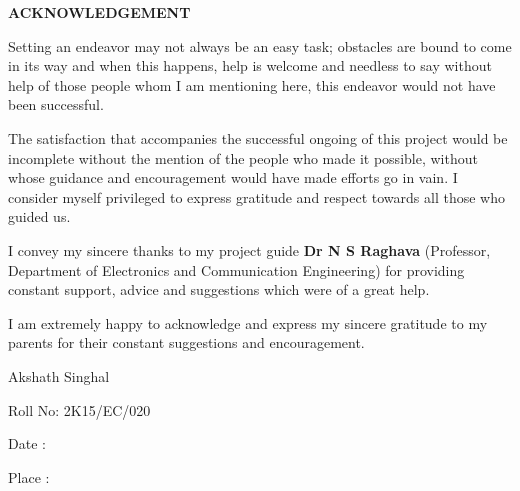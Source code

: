 \begin{spacing}{2}
\begin{center}
\fontsize{24pt}{24pt}\selectfont \textbf{ACKNOWLEDGEMENT\\}
\vspace*{1cm}
\end{center}
\fontsize{14pt}{14pt}\selectfont

Setting an endeavor may not always be an easy task; obstacles are bound to
come in its way and when this happens, help is welcome and needless to say
without help of those people whom I am mentioning here, this endeavor
would not have been successful.

The satisfaction that accompanies the successful ongoing of this project would
be incomplete without the mention of the people who made it possible,
without whose guidance and encouragement would have made efforts go in
vain. I consider myself privileged to express gratitude and respect towards all
those who guided us.

I convey my sincere thanks to my project guide \textbf{Dr N S Raghava} (Professor,
 Department of Electronics and Communication Engineering) for providing
constant support, advice and suggestions which were of a great help. 

I am extremely happy to acknowledge and express my sincere gratitude to my parents for their constant suggestions and encouragement.

\vspace{0.8cm}
Akshath Singhal

Roll No: 2K15/EC/020

Date :

Place :
\end{spacing}